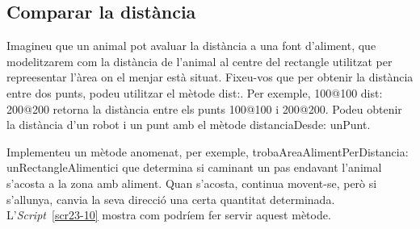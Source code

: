 \subsection{Comparar la distància}
Imagineu que un animal pot avaluar la distància a una font d'aliment, que modelitzarem com la distància de l'animal al centre del rectangle utilitzat per repreesentar l'àrea on el menjar està situat. Fixeu-vos que per obtenir la distància entre dos punts, podeu utilitzar el mètode \textsf{dist:}. Per exemple, \textsf{100@100 dist: 200@200} retorna la distància entre els punts \textsf{100@100} i \textsf{200@200}. Podeu obtenir la distància d'un robot i un punt amb el mètode \textsf{distanciaDesde: unPunt}. 

Implementeu un mètode anomenat, per exemple, \textsf{trobaAreaAlimentPerDistancia: unRectangleAlimentici} que determina si caminant un pas endavant l'animal s'acosta a la zona amb aliment. Quan s'acosta, continua movent-se, però si s'allunya, canvia la seva direcció una certa quantitat determinada. L'\emph{Script}~\ref{scr23-10} mostra com podríem fer servir aquest mètode. 


